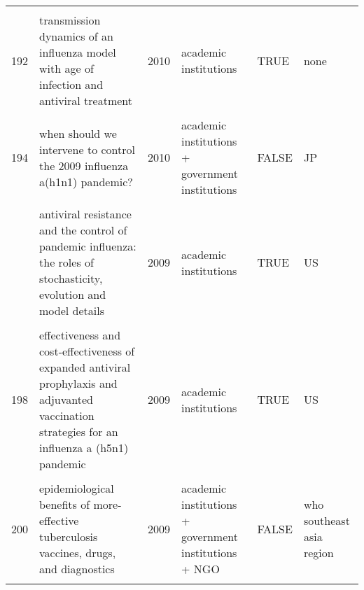 \documentclass[
]{article}
\begin{document}
\begin{landscape}
\begin{longtable}{l>{\raggedright\arraybackslash}p{4cm}l>{\raggedright\arraybackslash}p{3.5cm}l>{\raggedright\arraybackslash}p{1.5cm}}
\addlinespace
\cellcolor{gray!6}{191} & \cellcolor{gray!6}{the effect of mask use on the spread of influenza during a pandemic} & \cellcolor{gray!6}{2010} & \cellcolor{gray!6}{academic institutions + government institutions} & \cellcolor{gray!6}{FALSE} & \cellcolor{gray!6}{none}\\
192 & transmission dynamics of an influenza model with age of infection and antiviral treatment & 2010 & academic institutions & TRUE & none\\
\cellcolor{gray!6}{193} & \cellcolor{gray!6}{transmission risks and control of foot-and-mouth disease in the netherlands: spatial patterns} & \cellcolor{gray!6}{2010} & \cellcolor{gray!6}{academic institutions} & \cellcolor{gray!6}{TRUE} & \cellcolor{gray!6}{NL}\\
194 & when should we intervene to control the 2009 influenza a(h1n1) pandemic? & 2010 & academic institutions + government institutions & FALSE & JP\\
\cellcolor{gray!6}{195} & \cellcolor{gray!6}{adaptive vaccination strategies to mitigate pandemic influenza} & \cellcolor{gray!6}{2009} & \cellcolor{gray!6}{academic institutions + government institutions} & \cellcolor{gray!6}{FALSE} & \cellcolor{gray!6}{MX}\\
\addlinespace
196 & antiviral resistance and the control of pandemic influenza: the roles of stochasticity, evolution and model details & 2009 & academic institutions & TRUE & US\\
\cellcolor{gray!6}{197} & \cellcolor{gray!6}{economic evaluation of influenza pandemic mitigation strategies in the united states using a stochastic microsimulation transmission model} & \cellcolor{gray!6}{2009} & \cellcolor{gray!6}{academic institutions} & \cellcolor{gray!6}{TRUE} & \cellcolor{gray!6}{US}\\
198 & effectiveness and cost-effectiveness of expanded antiviral prophylaxis and adjuvanted vaccination strategies for an influenza a (h5n1) pandemic & 2009 & academic institutions & TRUE & US\\
\cellcolor{gray!6}{199} & \cellcolor{gray!6}{engineering responses to pandemics} & \cellcolor{gray!6}{2009} & \cellcolor{gray!6}{academic institutions} & \cellcolor{gray!6}{TRUE} & \cellcolor{gray!6}{HK}\\
200 & epidemiological benefits of more-effective tuberculosis vaccines, drugs, and diagnostics & 2009 & academic institutions + government institutions + NGO & FALSE & who southeast asia region\\
\addlinespace

\end{longtable}
\end{landscape}
\end{document}
